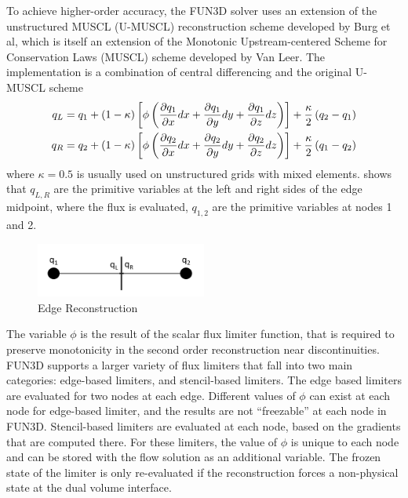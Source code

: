 To achieve higher-order accuracy, the FUN3D solver uses an extension of the
unstructured MUSCL (U-MUSCL) reconstruction scheme developed by Burg et
al\cite{burg2005higher,burg2003verification}, which is itself an extension of
the Monotonic Upstream-centered Scheme for Conservation Laws (MUSCL) scheme
developed by Van Leer\cite{van1979towards}.  The implementation is a combination
of central differencing and the original U-MUSCL scheme
\begin{equation}
  \begin{aligned}
    q_L &= q_1 + (1-\kappa)\left[ \phi\left( \frac{\partial q_1}{\partial x}dx + \frac{\partial q_1}{\partial y}dy +
    \frac{\partial q_1}{\partial z}dz \right) \right] + \frac{\kappa}{2}\left( q_2 - q_1 \right) \\
    q_R &= q_2 + (1-\kappa)\left[ \phi\left( \frac{\partial q_2}{\partial x}dx + \frac{\partial q_2}{\partial y}dy +
    \frac{\partial q_2}{\partial z}dz \right) \right] + \frac{\kappa}{2}\left( q_1 - q_2 \right)
  \end{aligned}
  \label{u-muscl}
\end{equation}
where $\kappa = 0.5$ is usually used on unstructured grids with mixed elements.
 shows that $q_{L,R}$ are the primitive variables at the
left and right sides of the edge midpoint, where the flux is evaluated,
$q_{1,2}$ are the primitive variables at nodes 1 and 2.
\begin{figure}[h]
  \centering
  \includegraphics[width=0.5\textwidth]{figures/edge_reconstruction.png}
  \caption{Edge Reconstruction}
  \label{fig:edge-recons}
\end{figure}
The variable $\phi$ is the result of the scalar flux limiter function, that is
required to preserve monotonicity in the second order reconstruction near
discontinuities.  FUN3D supports a larger variety of flux limiters that fall
into two main categories: edge-based limiters, and stencil-based limiters.  The
edge based limiters are evaluated for two nodes at each edge.  Different values
of $\phi$ can exist at each node for edge-based limiter, and the results are not
``freezable'' at each node in FUN3D. Stencil-based limiters are evaluated at
each node, based on the gradients that are computed there.  For these limiters,
the value of $\phi$ is unique to each node and can be stored with the flow
solution as an additional variable.  The frozen state of the limiter is only
re-evaluated if the reconstruction forces a non-physical state at the dual
volume interface.

